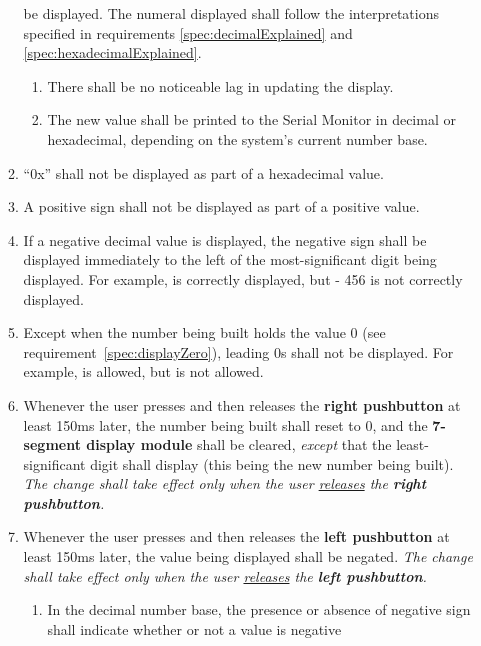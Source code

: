 \begin{enumerate}
\begin{enumerate}
        be displayed. The numeral displayed shall follow the interpretations
        specified in requirements \ref{spec:decimalExplained} and
        \ref{spec:hexadecimalExplained}.
        \begin{enumerate}
        \item There shall be no noticeable lag in updating the display.
        \item \label{spec:printValueToConsole} The new value shall be printed
            to the Serial Monitor in decimal or hexadecimal, depending on the
            system's current number base.
        \end{enumerate}
    \item ``0x'' shall not be displayed as part of a hexadecimal value.
    \item A positive sign shall not be displayed as part of a positive value.
    \item If a negative decimal value is displayed, the negative sign shall
        be displayed immediately to the left of the most-significant digit
        being displayed. For example, {} is correctly
        displayed, but {\dviiseg -    456} is not correctly displayed.
    \item \label{spec:noLeadingZeroes} Except when the number being built holds
        the value 0 (see requirement~\ref{spec:displayZero}), leading 0s shall not
        be displayed. For example, {} is allowed, but {} is not allowed.
    \item Whenever the user presses and then releases the \textbf{right
        pushbutton} at least 150ms later, the number being built shall reset to
        0, and the \textbf{7-segment display module} shall be cleared,
        \textit{except} that the least-significant digit shall display
        {} (this being the new number being built). \textit{The change
        shall take effect only when the user \underline{releases} the
        \textbf{right pushbutton}.}
    \item Whenever the user presses and then releases the \textbf{left
        pushbutton} at least 150ms later, the value being displayed shall be
        negated. \textit{The change shall take effect only when the user
        \underline{releases} the \textbf{left pushbutton}.}
        \begin{enumerate}
        \item In the decimal number base, the presence or absence of negative
            sign shall indicate whether or not a value is negative

\end{enumerate}
\end{enumerate}
\end{enumerate}
